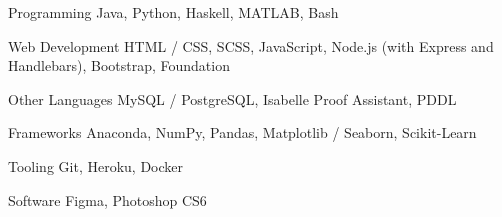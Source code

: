 

\begin{cvskills}

  \cvskill
    {Programming} %
    {Java, Python, Haskell, MATLAB, Bash} %
    
  \cvskill
    {Web Development} %
    {HTML / CSS, SCSS, JavaScript, Node.js (with Express and Handlebars), Bootstrap, Foundation}

  \cvskill
    {Other Languages} %
    {MySQL / PostgreSQL, Isabelle Proof Assistant, PDDL}
    
  \cvskill
    {Frameworks} %
    {Anaconda, NumPy, Pandas, Matplotlib / Seaborn, Scikit-Learn}
    
  \cvskill
    {Tooling} %
    {Git, Heroku, Docker}
    
  \cvskill
    {Software} %
    {Figma, Photoshop CS6}

\end{cvskills}

